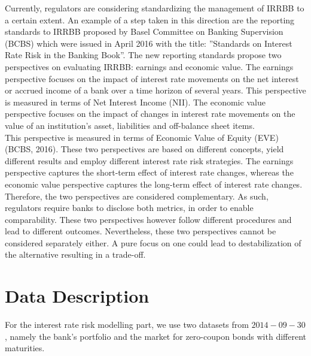 \documentclass[11pt]{article}
\begin{document}
Currently, regulators are considering standardizing the management of IRRBB to a certain extent. An example of a step taken in this direction are the reporting standards
to IRRBB proposed by Basel Committee on Banking Supervision (BCBS) which were
issued in April 2016 with the title: ”Standards on Interest Rate Risk in the Banking
Book”. The new reporting standards propose two perspectives on evaluating IRRBB:
earnings and economic value. The earnings perspective focuses on the impact of interest rate movements on the net interest or accrued income of a bank over a time
horizon of several years. This perspective is measured in terms of Net Interest Income
(NII). The economic value perspective focuses on the impact of changes in interest rate
movements on the value of an institution’s asset, liabilities and off-balance sheet items.\\


This perspective is measured in terms of Economic Value of Equity (EVE) (BCBS,
2016). These two perspectives are based on different concepts, yield different results
and employ different interest rate risk strategies.
The earnings perspective captures the short-term effect of interest rate changes, whereas
the economic value perspective captures the long-term effect of interest rate changes.
Therefore, the two perspectives are considered complementary. As such, regulators
require banks to disclose both metrics, in order to enable comparability. These two
perspectives however follow different procedures and lead to different outcomes. Nevertheless, these two perspectives cannot be considered separately either. A pure focus on one could lead to destabilization of the alternative resulting in a trade-off.




\section{Data Description}

For the interest rate risk modelling part, we use two datasets from $2014-09-30$, namely the bank's portfolio and the market for zero-coupon bonds with different maturities.\\
\end{document}
